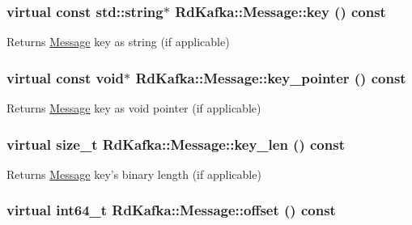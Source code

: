 \hypertarget{classRdKafka_1_1Message_a2430de7003342977001c9bab7604f152}{
\subsubsection[{key}]{\setlength{\rightskip}{0pt plus 5cm}virtual const std::string$\ast$ RdKafka::Message::key () const}}
\label{classRdKafka_1_1Message_a2430de7003342977001c9bab7604f152}
\begin{DoxyReturn}{Returns}
\hyperlink{classRdKafka_1_1Message}{Message} key as string (if applicable) 
\end{DoxyReturn}
\hypertarget{classRdKafka_1_1Message_a565d08ab88de128aca7efb57c3ed6c15}{
\subsubsection[{key\_\-pointer}]{\setlength{\rightskip}{0pt plus 5cm}virtual const void$\ast$ RdKafka::Message::key\_\-pointer () const}}
\label{classRdKafka_1_1Message_a565d08ab88de128aca7efb57c3ed6c15}
\begin{DoxyReturn}{Returns}
\hyperlink{classRdKafka_1_1Message}{Message} key as void pointer (if applicable) 
\end{DoxyReturn}
\hypertarget{classRdKafka_1_1Message_acde2505155defd52a279950113447dbb}{
\subsubsection[{key\_\-len}]{\setlength{\rightskip}{0pt plus 5cm}virtual size\_\-t RdKafka::Message::key\_\-len () const}}
\label{classRdKafka_1_1Message_acde2505155defd52a279950113447dbb}
\begin{DoxyReturn}{Returns}
\hyperlink{classRdKafka_1_1Message}{Message} key's binary length (if applicable) 
\end{DoxyReturn}
\hypertarget{classRdKafka_1_1Message_a5a8efc75fd27f8839997fc506776db67}{
\subsubsection[{offset}]{\setlength{\rightskip}{0pt plus 5cm}virtual int64\_\-t RdKafka::Message::offset () const}}
